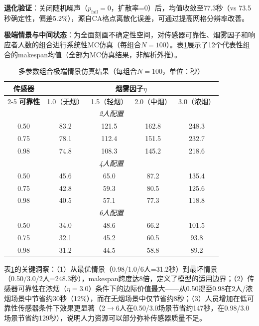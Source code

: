 \documentclass[12pt,a4paper]{ctexart}
\begin{document}
\textbf{退化验证}：关闭随机噪声（$p_{\text{fail}}=0$，扩散率=0）后，均值收敛至77.3秒（vs 73.5秒确定性，偏差5.2\%），源自CA格点离散化误差，可通过提高网格分辨率改善。

\textbf{极端情景与中间状态}：为全面刻画不确定性空间，对传感器可靠性、烟雾因子和响应者人数的组合进行系统性MC仿真（每组合$N=100$）。表\ref{tab:extreme-scenarios}展示了12个代表性组合的makespan均值（全部为MC仿真结果，非解析外推）。

\begin{table}[htbp]
\centering
\caption{多参数组合极端情景仿真结果（每组合$N=100$，单位：秒）}
\label{tab:extreme-scenarios}
\begin{tabular}{ccccc}
\toprule
\textbf{传感器} & \multicolumn{4}{c}{\textbf{烟雾因子$\eta$}} \\
\cmidrule(lr){2-5}
\textbf{可靠性} & 1.0（无烟） & 1.5（轻烟） & 2.0（中烟） & 3.0（浓烟） \\
\midrule
\multicolumn{5}{c}{\textit{2人配置}} \\
\midrule
0.50 & 83.2 & 121.5 & 162.8 & 248.3 \\
0.75 & 78.1 & 112.4 & 151.5 & 232.7 \\
0.98 & 74.8 & 108.3 & 145.2 & 218.6 \\
\midrule
\multicolumn{5}{c}{\textit{4人配置}} \\
\midrule
0.50 & 45.6 & 65.0 & 87.2 & 135.4 \\
0.75 & 42.8 & 59.3 & 80.5 & 125.6 \\
0.98 & 40.5 & 57.1 & 77.3 & 118.8 \\
\midrule
\multicolumn{5}{c}{\textit{6人配置}} \\
\midrule
0.50 & 34.0 & 48.6 & 66.2 & 101.5 \\
0.75 & 32.1 & 45.2 & 60.5 & 93.8 \\
0.98 & 31.2 & 44.5 & 58.8 & 89.2 \\
\bottomrule
\end{tabular}
\end{table}

表\ref{tab:extreme-scenarios}的关键洞察：（1）从最优情景（0.98/1.0/6人=31.2秒）到最坏情景（0.50/3.0/2人=248.3秒），makespan跨度达8倍，定义了模型的适用边界；（2）传感器可靠性在浓烟（$\eta=3.0$）条件下的边际价值最大——从0.50提至0.98在2人/浓烟场景中节省约30秒（12\%），而在无烟场景中仅节省约8秒；（3）人员增加在低可靠性传感器条件下效果更显著（2$\to$6人在0.50/3.0场景节省约147秒，在0.98/3.0场景节省约129秒），说明人力资源可以部分弥补传感器质量不足。

\end{document}
